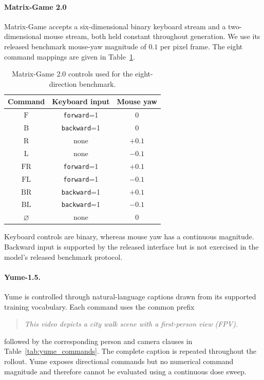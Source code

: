 \documentclass[letterpaper]{article} %
\begin{document}
\paragraph{Matrix-Game 2.0}
Matrix-Game accepts a six-dimensional binary keyboard stream and a
two-dimensional mouse stream, both held constant throughout generation. We
use its released benchmark mouse-yaw magnitude of $0.1$ per pixel frame. The
eight command mappings are given in
Table~\ref{tab:matrix_game_commands}.

\begin{table}[t]
\centering
{
\small
\begin{tabular}{ccc}
\toprule
Command & Keyboard input & Mouse yaw \\
\midrule
$\mathrm{F}$  & \texttt{forward}=1  & $0$ \\
$\mathrm{B}$  & \texttt{backward}=1 & $0$ \\
$\mathrm{R}$  & none                & $+0.1$ \\
$\mathrm{L}$  & none                & $-0.1$ \\
$\mathrm{FR}$ & \texttt{forward}=1  & $+0.1$ \\
$\mathrm{FL}$ & \texttt{forward}=1  & $-0.1$ \\
$\mathrm{BR}$ & \texttt{backward}=1 & $+0.1$ \\
$\mathrm{BL}$ & \texttt{backward}=1 & $-0.1$ \\
$\varnothing$ & none                & $0$ \\
\bottomrule
\end{tabular}
}
\caption{
    Matrix-Game 2.0 controls used for the eight-direction benchmark.
}
\label{tab:matrix_game_commands}
\end{table}

Keyboard controls are binary, whereas mouse yaw has a continuous magnitude.
Backward input is supported by the released interface but is not exercised in
the model's released benchmark protocol.

\paragraph{Yume-1.5.}
Yume is controlled through natural-language captions drawn from its supported
training vocabulary. Each command uses the common prefix
\begin{quote}
\small
\emph{This video depicts a city walk scene with a first-person view (FPV).}
\end{quote}
followed by the corresponding person and camera clauses in
Table~\ref{tab:yume_commands}. The complete caption is repeated throughout
the rollout. Yume exposes directional commands but no numerical command
magnitude and therefore cannot be evaluated using a continuous dose sweep.
\end{document}
